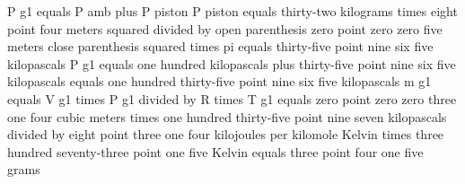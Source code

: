 P g1 equals P amb plus P piston  
P piston equals thirty-two kilograms times eight point four meters squared divided by open parenthesis zero point zero zero five meters close parenthesis squared times pi equals thirty-five point nine six five kilopascals  
P g1 equals one hundred kilopascals plus thirty-five point nine six five kilopascals equals one hundred thirty-five point nine six five kilopascals  
m g1 equals V g1 times P g1 divided by R times T g1 equals zero point zero zero three one four cubic meters times one hundred thirty-five point nine seven kilopascals divided by eight point three one four kilojoules per kilomole Kelvin times three hundred seventy-three point one five Kelvin equals three point four one five grams